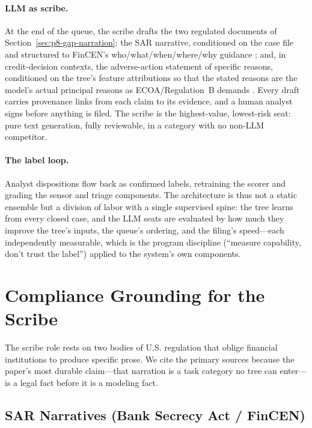 \documentclass{article}
\providecommand{\secref}[1]{Section~\ref{#1}}
\begin{document}
\paragraph{LLM as scribe.} At the end of the queue, the scribe drafts the two
regulated documents of \secref{sec:p8-gap-narration}: the SAR narrative,
conditioned on the case file and structured to FinCEN's
who/what/when/where/why guidance \citep{fincen2003sarnarrative}; and, in
credit-decision contexts, the adverse-action statement of specific reasons,
conditioned on the tree's feature attributions so that the stated reasons are
the model's actual principal reasons as ECOA/Regulation~B demands
\citep{cfr1002_9, cfpb2022circular}. Every draft carries provenance links from
each claim to its evidence, and a human analyst signs before anything is
filed. The scribe is the highest-value, lowest-risk seat: pure text
generation, fully reviewable, in a category with no non-LLM competitor.

\paragraph{The label loop.} Analyst dispositions flow back as confirmed
labels, retraining the scorer and grading the sensor and triage components.
The architecture is thus not a static ensemble but a division of labor with a
single supervised spine: the tree learns from every closed case, and the LLM
seats are evaluated by how much they improve the tree's inputs, the queue's
ordering, and the filing's speed---each independently measurable, which is the
program discipline (``measure capability, don't trust the label'') applied to
the system's own components.
 \section{Compliance Grounding for the Scribe}
\label{sec:p8-compliance}

The scribe role rests on two bodies of U.S. regulation that oblige financial
institutions to produce specific prose. We cite the primary sources because
the paper's most durable claim---that narration is a task category no tree can
enter---is a legal fact before it is a modeling fact.

\subsection{SAR Narratives (Bank Secrecy Act / FinCEN)}
\label{sec:p8-sar}
\end{document}
